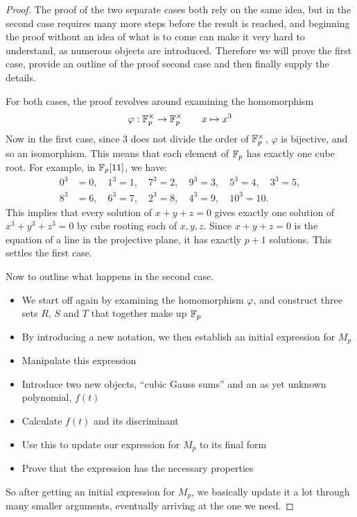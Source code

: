 \begin{proof}
The proof of the two separate cases both rely on the same idea, but in the second case requires many more steps before the result is reached, and beginning the proof without an idea of what is to come can make it very hard to understand, as numerous objects are introduced. Therefore we will prove the first case, provide an outline of the proof second case and then finally supply the details.

For both cases, the proof revolves around examining the homomorphism
$$\varphi: \mathbb{F}_{p}^{\times} \rightarrow \mathbb{F}_{p}^{\times} \qquad x \mapsto x^3$$
Now in the first case, since 3 does not divide the order of $\mathbb{F}_{p}^{\times}$, $\varphi$ is bijective, and so an isomorphism. This means that each element of $\mathbb{F}_p$ has exactly one cube root. For example, in $\mathbb{F}_p[11]$, we have:
\begin{align*}
	0^3 &= 0,\quad
	1^3 = 1,\quad
	7^3 = 2,\quad
	9^3 = 3,\quad
	5^3 = 4,\quad
	3^3 = 5,\\
	8^3 &= 6,\quad
	6^3 = 7,\quad
	2^3 = 8,\quad
	4^3 = 9,\quad
	10^3 = 10.
\end{align*}
This implies that every solution of $x + y + z = 0$ gives exactly one solution of $x^3 + y^3 + z^3 = 0$ by cube rooting each of $x,y,z$. Since $x + y + z = 0$ is the equation of a line in the projective plane, it has exactly $p+1$ solutions. This settles the first case.

Now to outline what happens in the second case.
\begin{itemize}
\item We start off again by examining the homomorphism $\varphi$, and construct three sets $R$, $S$ and $T$ that together make up $\mathbb{F}_p$
\item By introducing a new notation, we then establish an initial expression for $M_p$
\item Manipulate this expression
\item Introduce two new objects, ``cubic Gauss sums'' and an as yet unknown polynomial, $f(t)$
\item Calculate $f(t)$ and its discriminant
\item Use this to update our expression for $M_p$ to its final form
\item Prove that the expression has the necessary properties
\end{itemize}
So after getting an initial expression for $M_p$, we basically update it a lot through many smaller arguments, eventually arriving at the one we need.


\end{proof}
